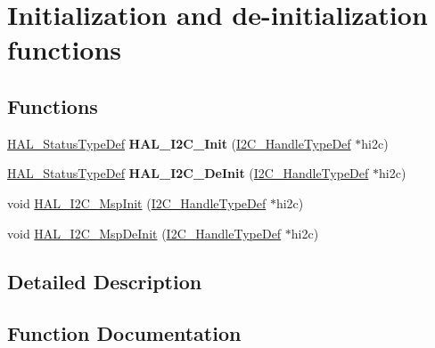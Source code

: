 \hypertarget{group___i2_c___exported___functions___group1}{}\section{Initialization and de-\/initialization functions}
\label{group___i2_c___exported___functions___group1}
\subsection*{Functions}
\begin{DoxyCompactItemize}
\item 
\mbox{\label{group___i2_c___exported___functions___group1_ga9d29159a6da072287fff73743fd93260}} 
\mbox{\hyperlink{stm32f7xx__hal__def_8h_a63c0679d1cb8b8c684fbb0632743478f}{H\+A\+L\+\_\+\+Status\+Type\+Def}} {\bfseries H\+A\+L\+\_\+\+I2\+C\+\_\+\+Init} (\mbox{\hyperlink{struct_____i2_c___handle_type_def}{I2\+C\+\_\+\+Handle\+Type\+Def}} $\ast$hi2c)
\item 
\mbox{\label{group___i2_c___exported___functions___group1_gabda634ba18f874775d1262c887d273b4}} 
\mbox{\hyperlink{stm32f7xx__hal__def_8h_a63c0679d1cb8b8c684fbb0632743478f}{H\+A\+L\+\_\+\+Status\+Type\+Def}} {\bfseries H\+A\+L\+\_\+\+I2\+C\+\_\+\+De\+Init} (\mbox{\hyperlink{struct_____i2_c___handle_type_def}{I2\+C\+\_\+\+Handle\+Type\+Def}} $\ast$hi2c)
\item 
void \mbox{\hyperlink{group___i2_c___exported___functions___group1_gabe01a202c27b23fc150aa66af3130073}{H\+A\+L\+\_\+\+I2\+C\+\_\+\+Msp\+Init}} (\mbox{\hyperlink{struct_____i2_c___handle_type_def}{I2\+C\+\_\+\+Handle\+Type\+Def}} $\ast$hi2c)
\item 
void \mbox{\hyperlink{group___i2_c___exported___functions___group1_ga2ec8d9b09854c732e2feed549278f048}{H\+A\+L\+\_\+\+I2\+C\+\_\+\+Msp\+De\+Init}} (\mbox{\hyperlink{struct_____i2_c___handle_type_def}{I2\+C\+\_\+\+Handle\+Type\+Def}} $\ast$hi2c)
\end{DoxyCompactItemize}


\subsection{Detailed Description}


\subsection{Function Documentation}
\mbox{\label{group___i2_c___exported___functions___group1_ga2ec8d9b09854c732e2feed549278f048}} 
